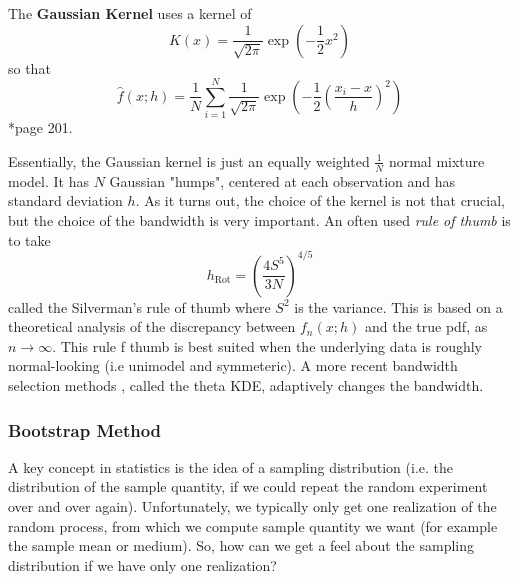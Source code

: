 \begin{defe} \label{defe: gauss_kern}
    The {\bf Gaussian Kernel} uses a kernel of
    \begin{equation*}
        K(x) = \frac{1}{\sqrt{2 \pi}} \exp \left( - \frac{1}{2} x^2 \right)
    \end{equation*}
    so that
    \begin{equation*}
        \hat{f} (x;h) = \frac{1}{N} \sum_{i=1}^{N} \frac{1}{\sqrt{2 \pi}} \exp \left( - \frac{1}{2} \left( \frac{x_i - x}{h} \right)^2 \right)
    \end{equation*}
    \cite{KroeseDirkP2013SMaC}*{page 201}.
\end{defe}
Essentially, the Gaussian kernel is just an equally weighted $\frac{1}{N}$ normal mixture model. It has $N$ Gaussian "humps", centered at each observation and has standard deviation $h$. As it turns out, the choice of the kernel is not that crucial, but the choice of the bandwidth is very important. An often used {\it rule of thumb} is to take
\begin{equation*}
    h_{\text{Rot}} = \left( \frac{4S^5}{3N} \right)^{4/5}
\end{equation*}
called the Silverman's rule of thumb where $S^2$ is the variance. This is based on a theoretical analysis of the discrepancy between $f_n (x;h)$ and the true pdf, as $n \to \infty$. This rule f thumb is best suited when the underlying data is roughly normal-looking (i.e unimodel and symmeteric). A more recent bandwidth selection methods \cite{10.1214/10-AOS799}, called the theta KDE, adaptively changes the bandwidth.

\subsubsection*{Bootstrap Method}

A key concept in statistics is the idea of a sampling distribution (i.e. the distribution of the sample quantity, if we could repeat the random experiment over and over again). Unfortunately, we typically only get one realization of the random process, from which we compute sample quantity we want (for example the sample mean or medium). So, how can we get a feel about the sampling distribution if we have only one realization?

